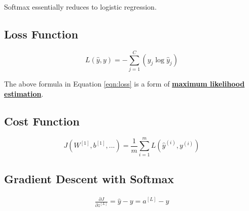 \documentclass{article}
\begin{document}
Softmax essentially reduces to logistic regression.

\subsection{Loss Function}

\begin{equation}
\label{eqn:loss}
L(\hat{y}, y) = -\sum_{j=1}^{C} \left( y_j \log\hat{y}_j \right)
\end{equation}

The above formula in Equation \ref{eqn:loss} is a form of \href{http://mathworld.wolfram.com/MaximumLikelihood.html}{\textbf{maximum likelihood estimation}}.

\subsection{Cost Function}

\begin{equation}
J(W^{[1]},b^{[1]},...) = \frac{1}{m}\sum_{i=1}^{m} L(\hat{y}^{(i)}, y^{(i)})
\end{equation}

\subsection{Gradient Descent with Softmax}

\begin{align}
\frac{\partial{J}}{\partial{z^{[L]}}} = \hat{y} - y = a^{[L]} - y
\end{align}
\end{document}
